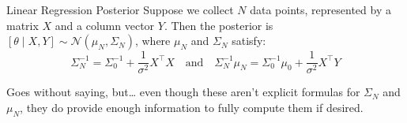 \begin{theorem}{Linear Regression Posterior}
    Suppose we collect $N$ data points,
    represented by a matrix $X$ and a column vector $Y$.
    Then the posterior is
    $[\theta \mid X, Y] \sim \mathcal{N}(\mu_N, \Sigma_N)$,
    where $\mu_N$ and $\Sigma_N$ satisfy:
    \[
    \Sigma_N^{-1} = \Sigma_0^{-1} + \frac{1}{\sigma^2}X^{\top}X
    ~~~ \text{ and } ~~~
    \Sigma_N^{-1}\mu_N = \Sigma_0^{-1}\mu_0 + \frac{1}{\sigma^2}X^{\top}Y
    \]
\end{theorem}

\begin{remark}
    Goes without saying, but\dots
    even though these aren't explicit formulas for $\Sigma_N$ and $\mu_N$,
    they do provide enough information
    to fully compute them if desired.
\end{remark}


